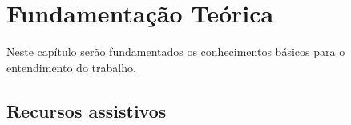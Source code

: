 \chapter{Fundamentação Teórica}
\label{ch:fundamentacao}
\par Neste capítulo ser\~ao fundamentados os conhecimentos b\'asicos para o entendimento do trabalho.

\section{Recursos assistivos}





